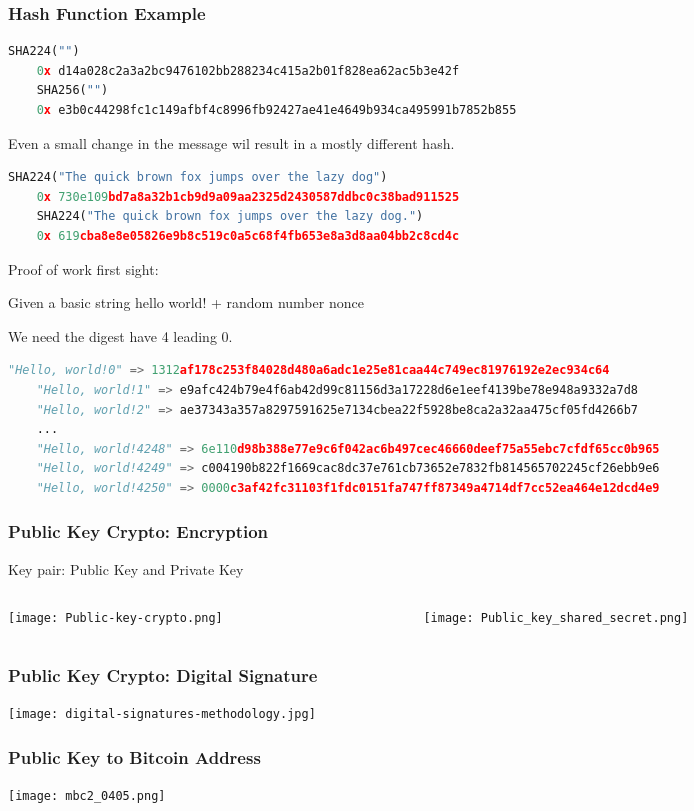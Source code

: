 \begin{frame}[fragile]
    \frametitle{Hash Function Example}
    \begin{lstlisting}[language=Python]
    SHA224("")
    0x d14a028c2a3a2bc9476102bb288234c415a2b01f828ea62ac5b3e42f
    SHA256("")
    0x e3b0c44298fc1c149afbf4c8996fb92427ae41e4649b934ca495991b7852b855
    \end{lstlisting}

    Even a small change in the message wil result in a mostly different hash.
    \begin{lstlisting}[language=Python]
    SHA224("The quick brown fox jumps over the lazy dog")
    0x 730e109bd7a8a32b1cb9d9a09aa2325d2430587ddbc0c38bad911525
    SHA224("The quick brown fox jumps over the lazy dog.")
    0x 619cba8e8e05826e9b8c519c0a5c68f4fb653e8a3d8aa04bb2c8cd4c
    \end{lstlisting}

    Proof of work first sight:

    Given a basic string \alert{hello world!} + random number \alert{nonce}

    We need the digest have 4 leading 0.
    \begin{lstlisting}[language=Python]
    "Hello, world!0" => 1312af178c253f84028d480a6adc1e25e81caa44c749ec81976192e2ec934c64
    "Hello, world!1" => e9afc424b79e4f6ab42d99c81156d3a17228d6e1eef4139be78e948a9332a7d8
    "Hello, world!2" => ae37343a357a8297591625e7134cbea22f5928be8ca2a32aa475cf05fd4266b7
    ...
    "Hello, world!4248" => 6e110d98b388e77e9c6f042ac6b497cec46660deef75a55ebc7cfdf65cc0b965
    "Hello, world!4249" => c004190b822f1669cac8dc37e761cb73652e7832fb814565702245cf26ebb9e6
    "Hello, world!4250" => 0000c3af42fc31103f1fdc0151fa747ff87349a4714df7cc52ea464e12dcd4e9
    \end{lstlisting}
\end{frame}

\begin{frame}
    \frametitle{Public Key Crypto: Encryption}
    Key pair: Public Key and Private Key
    \begin{columns}
        \begin{column}{0.35\textwidth}
            \begin{center}
                \texttt{[image: Public-key-crypto.png]}
            \end{center}
        \end{column}
        \begin{column}{0.65\textwidth}
            \begin{center}
                \texttt{[image: Public\_key\_shared\_secret.png]}
            \end{center}
        \end{column}
    \end{columns}
\end{frame}

\begin{frame}
    \frametitle{Public Key Crypto: Digital Signature}
    \texttt{[image: digital-signatures-methodology.jpg]}
\end{frame}

\begin{frame}
    \frametitle{Public Key to Bitcoin Address}
    \texttt{[image: mbc2\_0405.png]}
\end{frame}

